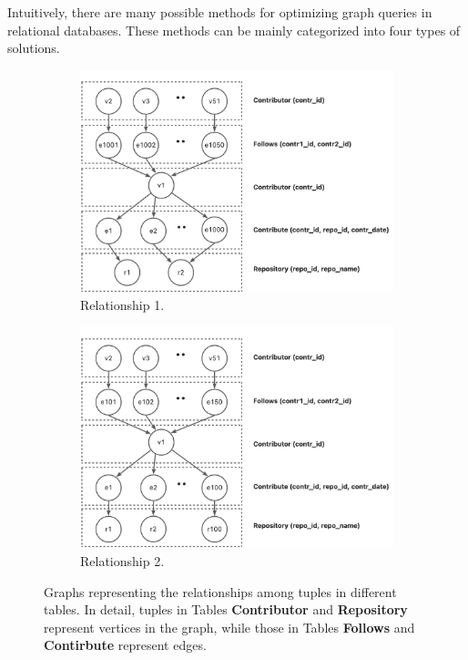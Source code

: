 Intuitively, there are many possible methods for optimizing graph queries in relational databases.
These methods can be mainly categorized into four types of solutions.

\begin{figure}
    \centering
    \begin{subfigure}[b]{0.4\linewidth}
        \centering
        \includegraphics[width=\linewidth]{./figures/intro-order-case.png}
        \caption{Relationship 1.}
        \label{fig:intro-order-case}
    \end{subfigure}
    \begin{subfigure}[b]{0.4\linewidth}
        \centering
        \includegraphics[width=\linewidth]{./figures/intro-order-case-2.png}
        \caption{Relationship 2.}
        \label{fig:intro-order-case2}
    \end{subfigure}
    \caption{Graphs representing the relationships among tuples in different tables. In detail, tuples in Tables \textbf{Contributor} and \textbf{Repository} represent vertices in the graph, while those in Tables \textbf{Follows} and \textbf{Contirbute} represent edges.}
    \label{fig:intro-replace-example}
\end{figure}

